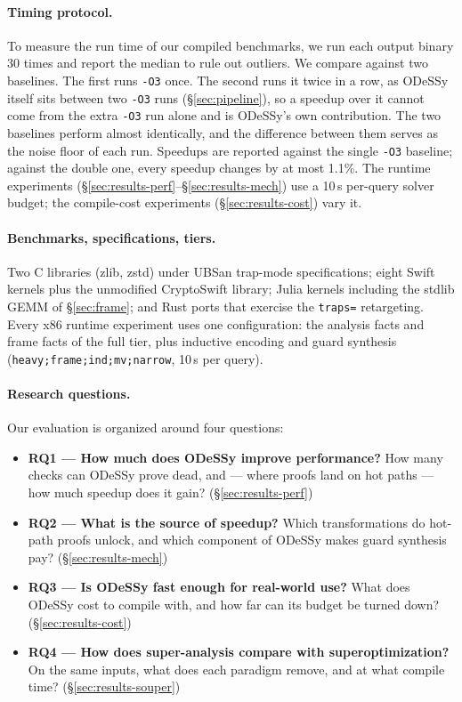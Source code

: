 \documentclass[acmsmall,screen,nonacm]{acmart}
\newcommand{\odessy}{ODeSSy}
\newcommand{\tool}{\odessy}
\begin{document}
\paragraph{Timing protocol.}
To measure the run time of our compiled benchmarks, we run each output binary 30 times and report the median to rule out outliers. We compare
against two baselines. The first runs \texttt{-O3} once. The second runs
it twice in a row, as \tool{} itself sits between two \texttt{-O3} runs
(\S\ref{sec:pipeline}), so a speedup over it cannot come from the extra
\texttt{-O3} run alone and is \tool{}'s own contribution. The two
baselines perform almost identically, and the difference between them
serves as the noise floor of each run. Speedups are reported against the
single \texttt{-O3} baseline; against the double one, every speedup
changes by at most 1.1\%. The runtime experiments (\S\ref{sec:results-perf}--\S\ref{sec:results-mech}) use a 10\,s per-query solver budget; the compile-cost experiments (\S\ref{sec:results-cost}) vary it.

\paragraph{Benchmarks, specifications, tiers.}
Two C libraries (zlib, zstd) under UBSan trap-mode
specifications; eight Swift kernels plus the unmodified CryptoSwift
library; Julia kernels including the stdlib GEMM of \S\ref{sec:frame};
and Rust ports that exercise the \texttt{traps=} retargeting. Every x86 runtime experiment uses one
configuration: the analysis facts and frame facts of the full tier, plus
inductive encoding and guard synthesis
(\texttt{heavy;frame;ind;mv;narrow}, 10\,s per query).
\paragraph{Research questions.}
Our evaluation is organized around four questions:
\begin{itemize}
\item \textbf{RQ1 --- How much does \tool{} improve performance?}
  How many checks can \tool{} prove dead, and --- where proofs land on
  hot paths --- how much speedup does it gain? (\S\ref{sec:results-perf})
\item \textbf{RQ2 --- What is the source of speedup?}
  Which transformations do hot-path proofs unlock, and which component
  of \tool{} makes guard synthesis pay? (\S\ref{sec:results-mech})
\item \textbf{RQ3 --- Is \tool{} fast enough for real-world use?}
  What does \tool{} cost to compile with, and how far can its budget be
  turned down? (\S\ref{sec:results-cost})
\item \textbf{RQ4 --- How does super-analysis compare with superoptimization?}
  On the same inputs, what does each paradigm remove, and at what compile
  time? (\S\ref{sec:results-souper})
\end{itemize}
\end{document}
